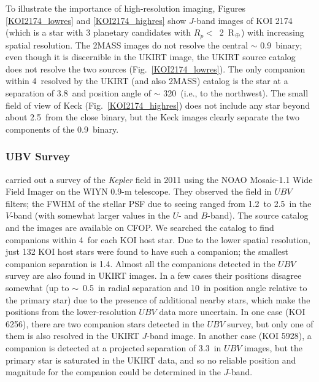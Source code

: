 \documentclass[twocolumn,appendixfloats]{aastex6}
\newcommand{\RE}{R$_{\Earth}$}
\begin{document}
To illustrate the importance of high-resolution imaging, Figures \ref{KOI2174_lowres}
and \ref{KOI2174_highres} show $J$-band images of KOI 2174 (which is a star with
3 planetary candidates with $R_p < $~2~\RE) with increasing spatial resolution. 
The 2MASS images do not resolve the central $\sim$ 0.9\arcsec\ binary; even though 
it is discernible in the UKIRT image, the UKIRT source catalog does not resolve 
the two sources (Fig.\ \ref{KOI2174_lowres}). The only companion within 4\arcsec\ 
resolved by the UKIRT (and also 2MASS) catalog is the star at a separation 
of 3.8\arcsec\ and position angle of $\sim$ 320\degr\ (i.e., to the northwest). 
The small field of view of Keck (Fig.\ \ref{KOI2174_highres}) does not include any 
star beyond about 2.5\arcsec\ from the close binary, but the Keck images clearly 
separate the two components of the 0.9\arcsec\ binary.

\vspace{1ex}

\subsubsection{UBV Survey}

\citet{everett12} carried out a survey of the {\it Kepler} field in 2011 using the
NOAO Mosaic-1.1 Wide Field Imager on the WIYN 0.9-m telescope. They 
observed the field in $UBV$ filters; the FWHM of the stellar PSF due to seeing 
ranged from 1.2\arcsec\ to 2.5\arcsec\ in the $V$-band (with somewhat larger 
values in the $U$- and $B$-band). The source catalog and the images are
available on CFOP.  We searched the catalog to find companions within
4\arcsec\ for each KOI host star. Due to the lower spatial resolution, just 132 KOI
host stars were found to have such a companion; the smallest companion 
separation is 1.4\arcsec. Almost all the companions detected in the $UBV$ 
survey are also found in UKIRT images. In a few cases their positions disagree 
somewhat (up to $\sim$~0.5\arcsec\ in radial separation and 10\degr-15\degr\ in 
position angle relative to the primary star) due to the presence of additional nearby 
stars, which make the positions from the lower-resolution $UBV$ data more uncertain.
In one case (KOI 6256), there are two companion stars detected in the
$UBV$ survey, but only one of them is also resolved in the UKIRT $J$-band image.
In another case (KOI 5928), a companion is detected at a projected separation 
of 3.3\arcsec\ in $UBV$ images, but the primary star is saturated in the UKIRT 
data, and so no reliable position and magnitude for the companion could be 
determined in the $J$-band.
\end{document}
